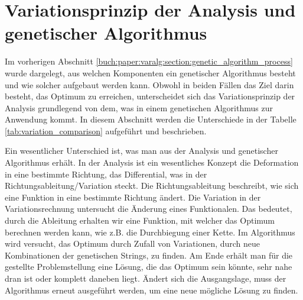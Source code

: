 %
%
%
%
\section{Variationsprinzip der Analysis und genetischer Algorithmus
  \label{buch:paper:varalg:section:variations_analysis_algorithm_result}}
Im vorherigen Abschnitt \ref{buch:paper:varalg:section:genetic_algorithm_process}
wurde dargelegt, aus welchen Komponenten ein genetischer Algorithmus besteht und wie 
solcher aufgebaut werden kann. 
Obwohl in beiden Fällen das Ziel darin besteht, das Optimum zu erreichen, unterscheidet
sich das Variationsprinzip der Analysis grundlegend von dem, was in einem genetischen 
Algorithmus zur Anwendung kommt. In diesem Abschnitt werden die Unterschiede in der 
Tabelle \ref{tab:variation_comparison} aufgeführt und beschrieben.

Ein wesentlicher Unterschied ist, was man aus der Analysis und genetischer Algorithmus 
erhält. In der Analysis ist ein wesentliches Konzept die Deformation in eine bestimmte 
Richtung, das Differential, was in der Richtungsableitung/Variation steckt. Die Richtungsableitung 
beschreibt, wie sich eine Funktion in eine bestimmte Richtung ändert. Die Variation in  
der Variationsrechnung untersucht die Änderung eines Funktionalen. Das bedeutet, durch die Ableitung 
erhalten wir eine Funktion, mit welcher das Optimum berechnen werden kann, wie z.B. die  
Durchbiegung einer Kette. Im Algorithmus wird versucht, das Optimum durch Zufall von   
Variationen, durch neue Kombinationen der genetischen Strings, zu finden. Am 
Ende erhält man für die gestellte Problemstellung eine Lösung, die das Optimum sein könnte,  
sehr nahe dran ist oder komplett daneben liegt. Ändert sich die Ausgangslage, muss der Algorithmus 
erneut ausgeführt werden, um eine neue mögliche Lösung zu finden. 


